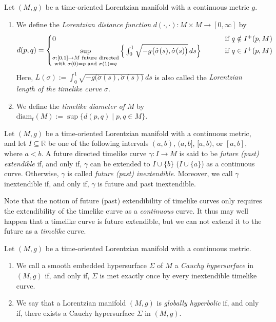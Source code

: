 \documentclass[reqno]{article}
\newcommand{\R}{\mathbb{R}}
\newcommand{\diam}{\mathrm{diam}}
\begin{document}
\begin{definition}
Let $(M,g)$ be a time-oriented Lorentzian manifold with a continuous metric $g$. 
\begin{enumerate}
\item We define the \emph{Lorentzian distance function} $d(\cdot, \cdot) : M \times M \to [0,\infty]$ by
\begin{equation*}
d(p,q) = \begin{cases} 0 &\textnormal{ if } q \notin I^+(p,M) \\ \sup\limits_{\substack{\sigma : [0,1] \to M \textnormal{ future directed} \\ \textnormal{with } \sigma(0) = p \textnormal{ and } \sigma(1) =q}} \Big{\{} \int_0^1 \sqrt{-g\big(\dot{\sigma}(s), \dot{\sigma}(s)\big)} \, ds \Big{\}} \qquad &\textnormal{ if } q \in I^+(p,M) \end{cases}
\end{equation*}
Here, $L(\sigma) := \int_0^1 \sqrt{-g\big(\dot{\sigma}(s), \dot{\sigma}(s)\big)} \, ds$ is also called the \emph{Lorentzian length of the timelike curve $\sigma$}.
\item We define the \emph{timelike diameter of $M$} by $\diam_t(M) := \sup\{d(p,q)\;|\; p,q \in M\}$.
\end{enumerate}
\end{definition}

\begin{definition}
Let $(M,g)$ be a time-oriented Lorentzian manifold with a continuous metric, and let $I \subseteq \R$ be one of the following intervals $(a,b)$, $(a,b]$, $[a,b)$, or $[a,b]$, where $a <b$.  A future directed timelike curve $\gamma : I \to M$ is said to be \emph{future (past) extendible} if, and only if, $\gamma$ can be extended to $I \cup \{b\}$ ($I \cup \{a\}$) as a continuous curve. Otherwise, $\gamma$ is called \emph{future (past) inextendible}. Moreover, we call $\gamma$ inextendible if, and only if, $\gamma$ is future and past inextendible.
\end{definition}

\begin{remark}
Note that the notion of future (past) extendibility of timelike curves only requires the extendibility of the timelike curve as a \emph{continuous} curve. It thus may well happen that a timelike curve is future extendible, but we can not extend it to the future as a \emph{timelike} curve.
\end{remark}

\begin{definition} 
Let $(M,g)$ be a time-oriented Lorentzian manifold with a continuous metric. 
\begin{enumerate}
\item
We call a smooth embedded hypersurface $\Sigma$ of $M$ a \emph{Cauchy hypersurface} in $(M,g)$ if, and only if, $\Sigma$ is met exactly once by every inextendible timelike curve.
\item 
We say that a Lorentzian manifold $(M,g)$ is \emph{globally hyperbolic} if, and only if, there exists a Cauchy hypersurface $\Sigma$ in $(M,g)$.
\end{enumerate}
\end{definition}
\end{document}
